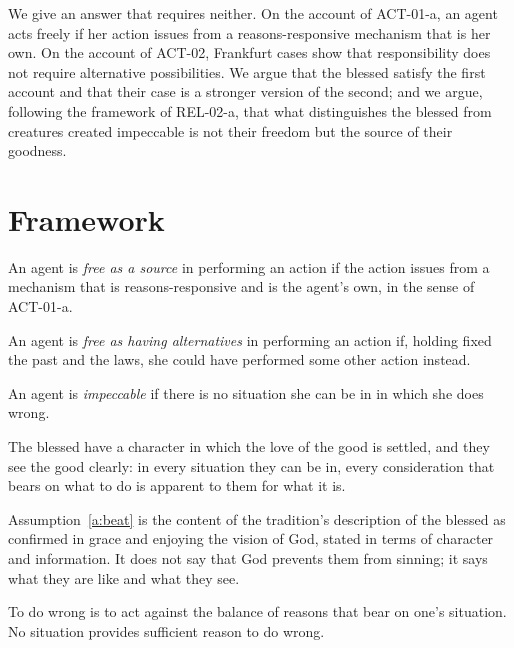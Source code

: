 \documentclass{situationist-preprint}
\begin{document}
We give an answer that requires neither. On the account of ACT-01-a, an agent acts freely if her action issues from a reasons-responsive mechanism that is her own. On the account of ACT-02, Frankfurt cases show that responsibility does not require alternative possibilities. We argue that the blessed satisfy the first account and that their case is a stronger version of the second; and we argue, following the framework of REL-02-a, that what distinguishes the blessed from creatures created impeccable is not their freedom but the source of their goodness.

\section{Framework}

\begin{definition}\label{d:source}
An agent is \emph{free as a source} in performing an action if the action issues from a mechanism that is reasons-responsive and is the agent's own, in the sense of ACT-01-a.
\end{definition}

\begin{definition}\label{d:alt}
An agent is \emph{free as having alternatives} in performing an action if, holding fixed the past and the laws, she could have performed some other action instead.
\end{definition}

\begin{definition}[Impeccability]\label{d:imp}
An agent is \emph{impeccable} if there is no situation she can be in in which she does wrong.
\end{definition}

\begin{assumption}\label{a:beat}
The blessed have a character in which the love of the good is settled, and they see the good clearly: in every situation they can be in, every consideration that bears on what to do is apparent to them for what it is.
\end{assumption}

Assumption~\ref{a:beat} is the content of the tradition's description of the blessed as confirmed in grace and enjoying the vision of God, stated in terms of character and information. It does not say that God prevents them from sinning; it says what they are like and what they see.

\begin{principle}\label{p:wrong}
To do wrong is to act against the balance of reasons that bear on one's situation. No situation provides sufficient reason to do wrong.
\end{principle}
\end{document}
